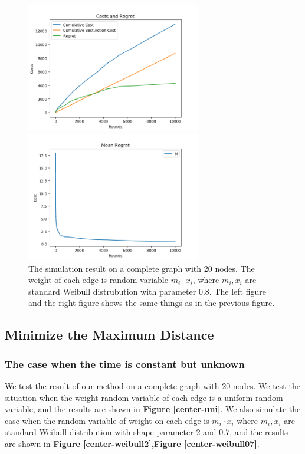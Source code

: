 \documentclass{article}
\theoremstyle{plain}
\theoremstyle{definition}
\theoremstyle{remark}
\begin{document}
    \begin{figure}[htbp!]
        \begin{minipage}[h]{0.5\linewidth}
            \centering
            \includegraphics[width=3in]{spanning-cost-regret-weibull08.png}
        \end{minipage}
        \begin{minipage}[h]{0.5\linewidth}
            \centering
            \includegraphics[width=3in]{spanning-mean-regret-weibull08.png}
        \end{minipage}
        \caption{The simulation result on a complete graph with 20 nodes. The weight of each edge is random variable $m_i \cdot x_i$, where $m_i,x_i$ are standard Weibull distrubution with parameter $0.8$. The left figure and the right figure shows the same things as in the previous figure.}
        \label{spanning-weibull08}
    \end{figure}

    \subsection{Minimize the Maximum Distance}
    \subsubsection{The case when the time is constant but unknown}

    We test the result of our method on a complete graph with 20 nodes. We test the situation when the weight random variable of each edge is a uniform random variable, and the results are shown in \textbf{Figure \ref{center-uni}}. We also simulate the case when the random variable of weight on each edge is $m_i\cdot x_i$ where $m_i,x_i$ are standard Weibull distribution with shape parameter $2$ and $0.7$, and the results are shown in \textbf{Figure \ref{center-weibull2},Figure \ref{center-weibull07}}.
\end{document}
